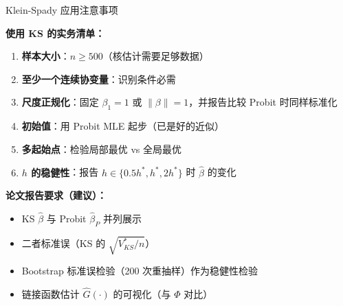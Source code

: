 \documentclass[aspectratio=169, 10pt]{beamer}
\begin{document}
\begin{frame}{Klein-Spady 应用注意事项}

  \begin{keybox}
    \textbf{使用 KS 的实务清单：}
    \begin{enumerate}\setlength{\itemsep}{1pt}
      \item \textbf{样本大小}：$n \geq 500$（核估计需要足够数据）
      \item \textbf{至少一个连续协变量}：识别条件必需
      \item \textbf{尺度正规化}：固定 $\beta_1 = 1$ 或 $\|\beta\| = 1$，并报告比较 Probit 时同样标准化
      \item \textbf{初始值}：用 Probit MLE 起步（已是好的近似）
      \item \textbf{多起始点}：检验局部最优 vs 全局最优
      \item \textbf{$h$ 的稳健性}：报告 $h \in \{0.5h^{*}, h^{*}, 2h^{*}\}$ 时 $\hat\beta$ 的变化
    \end{enumerate}
  \end{keybox}

  \begin{highlightbox}
    \textbf{论文报告要求（建议）：}
    \begin{itemize}\setlength{\itemsep}{1pt}
      \item KS $\hat\beta$ 与 Probit $\hat\beta_P$ 并列展示
      \item 二者标准误（KS 的 $\sqrt{V^{*}_{KS}/n}$）
      \item Bootstrap 标准误检验（200 次重抽样）作为稳健性检验
      \item 链接函数估计 $\hat G(\cdot)$ 的可视化（与 $\Phi$ 对比）
    \end{itemize}
  \end{highlightbox}

\end{frame}
\end{document}

